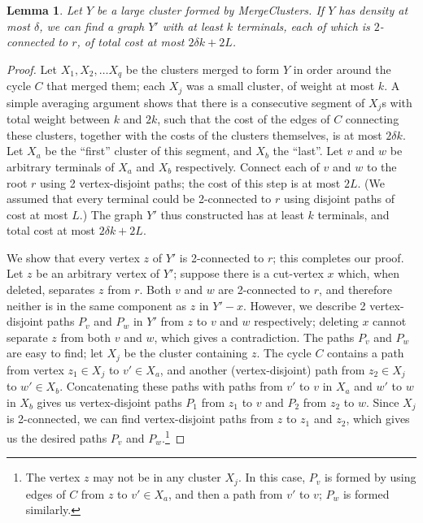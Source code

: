 \documentclass[11pt]{article}
\newtheorem{lemma}{Lemma}[section]
\begin{document}
\begin{lemma}\label{lem:segment}
  Let $Y$ be a large cluster formed by {\sc MergeClusters}. If $Y$ has
  density at most $\delta$, we can find a graph $Y'$ with at least $k$
  terminals, each of which is $2$-connected to $r$, of total cost at
  most $2 \delta k + 2 L$.
\end{lemma}
\begin{proof}
  Let $X_1, X_2, \ldots X_q$ be the clusters merged to form $Y$ in
  order around the cycle $C$ that merged them; each $X_j$ was a small
  cluster, of weight at most $k$. A simple averaging argument shows
  that there is a consecutive segment of $X_j$s with total weight
  between $k$ and $2k$, such that the cost of the edges of $C$
  connecting these clusters, together with the costs of the clusters
  themselves, is at most $2 \delta k$. Let $X_a$ be the ``first''
  cluster of this segment, and $X_b$ the ``last''. Let $v$ and $w$ be
  arbitrary terminals of $X_a$ and $X_b$ respectively. Connect each of
  $v$ and $w$ to the root $r$ using 2 vertex-disjoint paths; the cost
  of this step is at most $2L$. (We assumed that every terminal could
  be 2-connected to $r$ using disjoint paths of cost at most $L$.)
  The graph $Y'$ thus constructed has at least $k$ terminals, and
  total cost at most $2 \delta k + 2L$.  

  We show that every vertex $z$ of $Y'$ is 2-connected to $r$; this
  completes our proof. Let $z$ be an arbitrary vertex of $Y'$; suppose
  there is a cut-vertex $x$ which, when deleted, separates $z$ from
  $r$. Both $v$ and $w$ are 2-connected to $r$, and therefore neither
  is in the same component as $z$ in $Y' - x$. However, we describe 2
  vertex-disjoint paths $P_v$ and $P_w$ in $Y'$ from $z$ to $v$ and
  $w$ respectively; deleting $x$ cannot separate $z$ from both $v$ and
  $w$, which gives a contradiction. The paths $P_v$ and $P_w$ are easy
  to find; let $X_j$ be the cluster containing $z$. The cycle $C$
  contains a path from vertex $z_1 \in X_j$ to $v' \in X_a$, and
  another (vertex-disjoint) path from $z_2 \in X_j$ to $w' \in X_b$.
  Concatenating these paths with paths from $v'$ to $v$ in $X_a$ and
  $w'$ to $w$ in $X_b$ gives us vertex-disjoint paths $P_1$ from $z_1$
  to $v$ and $P_2$ from $z_2$ to $w$. Since $X_j$ is 2-connected, we
  can find vertex-disjoint paths from $z$ to $z_1$ and $z_2$, which
  gives us the desired paths $P_v$ and $P_w$.\footnote{The vertex $z$
    may not be in any cluster $X_j$. In this case, $P_v$ is formed by
    using edges of $C$ from $z$ to $v' \in X_a$, and then a path from
    $v'$ to $v$; $P_w$ is formed similarly.}
\end{proof}
\end{document}
